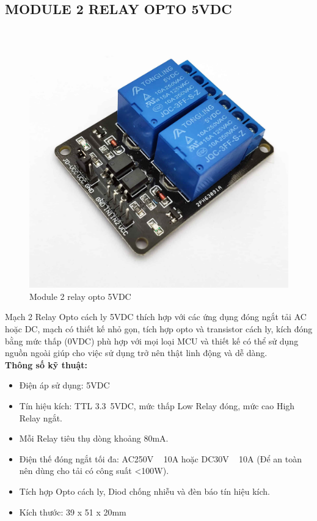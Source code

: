 \subsection{MODULE 2 RELAY OPTO 5VDC}
\begin{figure}[H]
	\centering
	\includegraphics[scale=.1]{Chapter 3/image chapter 3/2relay.jpg}
	\caption[Module 2 relay opto 5VDC]{Module 2 relay opto 5VDC}
	\label{hinh39}
\end{figure}
Mạch 2 Relay Opto cách ly 5VDC thích hợp với các ứng dụng đóng ngắt tải AC hoặc DC, mạch có thiết kế nhỏ gọn, tích hợp opto và transistor cách ly, kích đóng bằng mức thấp (0VDC) phù hợp với mọi loại MCU và thiết kế có thể sử dụng nguồn ngoài giúp cho việc sử dụng trở nên thật linh động và dễ dàng.\\
\indent \textbf{Thông số kỹ thuật:}
\begin{itemize}
	\item Điện áp sử dụng: 5VDC
	\item Tín hiệu kích: TTL 3.3~5VDC, mức thấp Low Relay đóng, mức cao High Relay ngắt.
	\item Mỗi Relay tiêu thụ dòng khoảng 80mA.
	\item Điện thế đóng ngắt tối đa: AC250V ~ 10A hoặc DC30V ~ 10A (Để an toàn nên dùng cho tải có công suất <100W).
	\item Tích hợp Opto cách ly, Diod chống nhiễu và đèn báo tín hiệu kích.
	\item Kích thước: 39 x 51 x 20mm
\end{itemize}